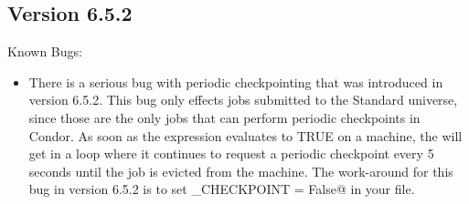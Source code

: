 \subsection{\label{sec:New-6-5-3}Version 6.5.2}

\noindent Known Bugs:
\begin{itemize}

\item There is a serious bug with periodic checkpointing that was
  introduced in version 6.5.2.
  This bug only effects jobs submitted to the Standard universe, since
  those are the only jobs that can perform periodic checkpoints in
  Condor. 
  As soon as the  expression evaluates to
  TRUE on a machine, the  will get in a loop where it
  continues to request a periodic checkpoint every 5 seconds until the
  job is evicted from the machine.
  The work-around for this bug in version 6.5.2 is to set
  \verb@PERIODIC_CHECKPOINT = False@ in your 
  file.

\end{itemize}

